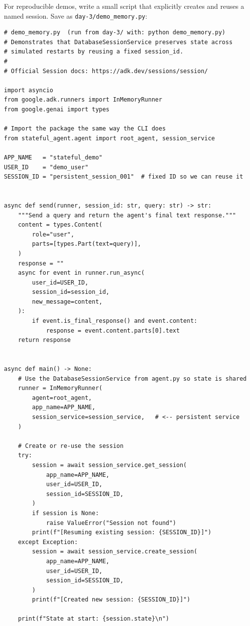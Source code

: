 \documentclass[12pt, a4paper]{article}
\begin{document}
\begin{practicalbox}
For reproducible demos, write a small script that explicitly creates and reuses
a named session. Save as \texttt{day-3/demo\_memory.py}:

\begin{lstlisting}[style=pythonstyle, caption={day-3/demo\_memory.py --- demonstrate cross-restart recall}]
# demo_memory.py  (run from day-3/ with: python demo_memory.py)
# Demonstrates that DatabaseSessionService preserves state across
# simulated restarts by reusing a fixed session_id.
#
# Official Session docs: https://adk.dev/sessions/session/

import asyncio
from google.adk.runners import InMemoryRunner
from google.genai import types

# Import the package the same way the CLI does
from stateful_agent.agent import root_agent, session_service

APP_NAME   = "stateful_demo"
USER_ID    = "demo_user"
SESSION_ID = "persistent_session_001"  # fixed ID so we can reuse it


async def send(runner, session_id: str, query: str) -> str:
    """Send a query and return the agent's final text response."""
    content = types.Content(
        role="user",
        parts=[types.Part(text=query)],
    )
    response = ""
    async for event in runner.run_async(
        user_id=USER_ID,
        session_id=session_id,
        new_message=content,
    ):
        if event.is_final_response() and event.content:
            response = event.content.parts[0].text
    return response


async def main() -> None:
    # Use the DatabaseSessionService from agent.py so state is shared
    runner = InMemoryRunner(
        agent=root_agent,
        app_name=APP_NAME,
        session_service=session_service,   # <-- persistent service
    )

    # Create or re-use the session
    try:
        session = await session_service.get_session(
            app_name=APP_NAME,
            user_id=USER_ID,
            session_id=SESSION_ID,
        )
        if session is None:
            raise ValueError("Session not found")
        print(f"[Resuming existing session: {SESSION_ID}]")
    except Exception:
        session = await session_service.create_session(
            app_name=APP_NAME,
            user_id=USER_ID,
            session_id=SESSION_ID,
        )
        print(f"[Created new session: {SESSION_ID}]")

    print(f"State at start: {session.state}\n")


\end{lstlisting}
\end{practicalbox}
\end{document}
